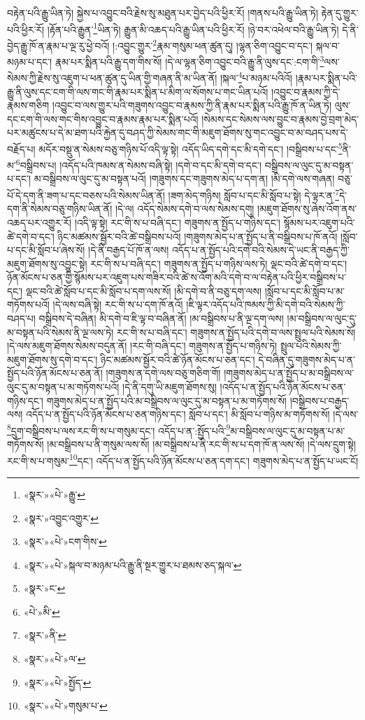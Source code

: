 བརྟེན་པའི་རྒྱུ་ཡིན་ཏེ། སྐྱེས་པ་འབྱུང་བའི་རྗེས་སུ་མཐུན་པར་བྱེད་པའི་ཕྱིར་རོ། །གནས་པའི་རྒྱུ་ཡིན་ཏེ། རྟེན་དུ་གྱུར་པའི་ཕྱིར་རོ། །རྟོན་པའི་རྒྱུན་\footnote{«སྣར་»«པེ་»རྒྱུ་}ཡིན་ཏེ། རྒྱུན་མི་འཆད་པའི་རྒྱུ་ཡིན་པའི་ཕྱིར་རོ། །ཉེ་བར་འཕེལ་བའི་རྒྱུ་ཡིན་ཏེ། དེ་ནི་བྱེད་རྒྱུ་ཁོ་ན་རྣམ་པ་ལྔ་རུ་ཕྱེ་བའོ། །:འབྱུང་གྱུར་\footnote{«སྣར་»འབྱུང་འགྱུར་}རྣམ་གསུམ་ཕན་ཚུན་དུ། །ལྷན་ཅིག་འབྱུང་བ་དང་། སྐལ་བ་མཉམ་པ་དང་། རྣམ་པར་སྨིན་པའི་རྒྱུ་དག་གིས་སོ། །དེ་ལ་ལྷན་ཅིག་འབྱུང་བའི་རྒྱུ་ནི་ལུས་དང་:ངག་གི་\footnote{«སྣར་»«པེ་»ངག་གིས་}ལས་སེམས་ཀྱི་རྗེས་སུ་འཇུག་པ་ཕན་ཚུན་དུ་ཡིན་གྱི་གཞན་ནི་མ་ཡིན་ནོ། །སྐལ་\footnote{«སྣར་»«པེ་»སྐལ་བ་མཉམ་པའི་རྒྱུ་ནི་སྔར་གྱུར་པ་ཐམས་ཅད་སྐལ་}པ་མཉམ་པའིའོ། །རྣམ་པར་སྨིན་པའི་རྒྱུ་ནི་ལུས་དང་ངག་གི་ལས་གང་གི་རྣམ་པར་སྨིན་པ་མིག་ལ་སོགས་པ་གང་ཡིན་པའོ། །འབྱུང་བ་རྣམས་ཀྱི་དེ་རྣམས་གཅིག །འབྱུང་བ་ལས་གྱུར་པའི་གཟུགས་འབྱུང་བ་རྣམས་ཀྱི་ནི་རྣམ་པར་སྨིན་པའི་རྒྱུ་ཁོ་ན་ཡིན་ཏེ། ལུས་དང་ངག་གི་ལས་གང་གིས་འབྱུང་བ་རྣམས་རྣམ་པར་སྨིན་པའོ། །སེམས་དང་སེམས་ལས་བྱུང་བ་རྣམས་བྱེ་བྲག་མེད་པར་མཚུངས་པ་དེ་མ་ཐག་པའི་རྐྱེན་དུ་བཤད་ཀྱི་སེམས་གང་གི་མཇུག་ཐོགས་སུ་གང་འབྱུང་བ་མ་བཤད་པས་དེ་བརྗོད་པ། མདོར་བསྡུ་ན་སེམས་བཅུ་གཉིས་པོ་འདི་ལྟ་སྟེ། འདོད་ཡིད་དགེ་དང་མི་དགེ་དང་། །བསྒྲིབས་པ་དང་\footnote{«སྣར་»ང་}ནི་མ་\footnote{«པེ་»མི་}བསྒྲིབས་པ། །འདོད་པའི་ཁམས་ན་སེམས་བཞི་སྟེ། །དགེ་བ་དང་མི་དགེ་བ་དང་། བསྒྲིབས་ལ་ལུང་དུ་མ་བསྟན་པ་དང་། མ་བསྒྲིབས་ལ་ལུང་དུ་མ་བསྟན་པའོ། །གཟུགས་དང་གཟུགས་མེད་པ་དག་ན། །མི་དགེ་ལས་གཞན། བཅུ་པོ་དེ་དག་ནི་ཟག་པ་དང་བཅས་པའི་སེམས་ཡིན་ནོ། །ཟག་མེད་གཉིས། སློབ་པ་དང་མི་སློབ་པ་སྟེ། དེ་ལྟར་ན་\footnote{«སྣར་»ནི་}དེ་དག་ནི་སེམས་བཅུ་གཉིས་ཡིན་ནོ། །དེ་ལ། འདོད་སེམས་དགེ་བ་ལས་སེམས་དགུ། །མཇུག་ཐོགས་སུ་ཞེས་འོག་ནས་འཆད་པར་འགྱུར་རོ། །འདི་ལྟ་སྟེ། རང་གི་ས་པ་བཞི་དང་། གཟུགས་ན་སྤྱོད་པ་གཉིས་དང་། སྙོམས་པར་འཇུག་པའི་ཚེ་དགེ་བ་དང་། ཉིང་མཚམས་སྦྱོར་བའི་ཚེ་བསྒྲིབས་པའོ། །གཟུགས་མེད་པ་ན་སྤྱོད་པ་ནི་བསྒྲིབས་པ་ཁོ་ནའོ། །སློབ་པ་དང་མི་སློབ་པ་ཞེས་སོ། །དེ་ནི་བརྒྱད་པོ་ཁོ་ན་ལས། འདོད་པ་ན་སྤྱོད་པའི་དགེ་བའི་སེམས་དེ་ཡང་ནི་བརྒྱད་ཀྱི་མཇུག་ཐོགས་སུ་འབྱུང་སྟེ། རང་གི་ས་པ་བཞི་དང་། གཟུགས་ན་སྤྱོད་པ་གཉིས་ལས་ཏེ། ལྡང་བའི་ཚེ་དགེ་བ་དང་། ཉོན་མོངས་པ་ཅན་གྱི་སྙོམས་པར་འཇུག་པས་གཟིར་བའི་ཚེ་ས་འོག་མའི་དགེ་བ་ལ་བརྟེན་པའི་ཕྱིར་བསྒྲིབས་པ་དང་། ལྡང་བའི་ཚེ་སློབ་པ་དང་མི་སློབ་པ་དག་ལས་སོ། །མི་དགེ་བ་ནི་བཅུ་དག་ལས། །སློབ་པ་དང་མི་སློབ་པ་མ་གཏོགས་པའོ། །དེ་ལས་བཞི་སྟེ། རང་གི་ས་པ་དག་ཁོ་ནའོ། །ཇི་ལྟར་འདོད་པའི་ཁམས་ཀྱི་མི་དགེ་བའི་སེམས་ཀྱི་བཤད་པ། བསྒྲིབས་དེ་བཞིན། མི་དགེ་བ་ཇི་ལྟ་བ་བཞིན་ནོ། །མ་བསྒྲིབས་པ་ནི་ལྔ་དག་ལས། །མ་བསྒྲིབས་ལ་ལུང་དུ་མ་བསྟན་པའི་སེམས་ནི་ལྔ་ལས་ཏེ། རང་གི་ས་པ་བཞི་དང་། གཟུགས་ན་སྤྱོད་པའི་དགེ་བ་ལས་སྤྲུལ་པའི་སེམས་སོ། །དེ་ལས་མཇུག་ཐོགས་སེམས་བདུན་ནོ། །རང་གི་བཞི་དང་། གཟུགས་ན་སྤྱོད་པ་གཉིས་ཏེ། སྤྲུལ་པའི་སེམས་ཀྱི་མཇུག་ཐོགས་སུ་དགེ་བ་དང་། ཉིང་མཚམས་སྦྱོར་བའི་ཚེ་ཉོན་མོངས་པ་ཅན་དང་། དེ་བཞིན་དུ་གཟུགས་མེད་པ་ན་སྤྱོད་པའི་ཉོན་མོངས་པ་ཅན་ནོ། །གཟུགས་ན་དགེ་ལས་བཅུ་གཅིག་གོ། །གཟུགས་མེད་པ་ན་སྤྱོད་པ་མ་བསྒྲིབས་ལ་ལུང་དུ་མ་བསྟན་པ་མ་གཏོགས་པའོ། །དེ་ནི་དགུ་ཡི་མཇུག་ཐོགས་སུ། །འདོད་པ་ན་སྤྱོད་པའི་ཉོན་མོངས་པ་ཅན་གཉིས་དང་། གཟུགས་མེད་པ་ན་སྤྱོད་པའི་མ་བསྒྲིབས་ལ་ལུང་དུ་མ་བསྟན་པ་མ་གཏོགས་སོ། །བསྒྲིབས་པ་བརྒྱད་ལས། འདོད་པ་ན་སྤྱོད་པའི་ཉོན་མོངས་པ་ཅན་གཉིས་དང་། སློབ་པ་དང་། མི་སློབ་པ་གཉིས་མ་གཏོགས་སོ། །དེ་ལས་\footnote{«སྣར་»«པེ་»ལ་}དྲུག་བསྒྲིབས་པ་ལས་རང་གི་ས་པ་གསུམ་དང་། འདོད་པ་ན་:སྤྱོད་པའི་\footnote{«སྣར་»«པེ་»སྤྱོད་}མ་བསྒྲིབས་ལ་ལུང་དུ་མ་བསྟན་པ་མ་གཏོགས་སོ། །མ་བསྒྲིབས་པ་ནི་གསུམ་ལས་སོ། །མ་བསྒྲིབས་པ་ནི་རང་གི་ས་པ་དག་ཁོ་ན་ལས་སོ། །དེ་ལས་དྲུག་སྟེ། རང་གི་ས་པ་གསུམ་\footnote{«སྣར་»«པེ་»གསུམ་པ་}དང་། འདོད་པ་ན་སྤྱོད་པའི་ཉོན་མོངས་པ་ཅན་དག་དང་། གཟུགས་མེད་པ་ན་སྤྱོད་པ་ཡང་ངོ། 